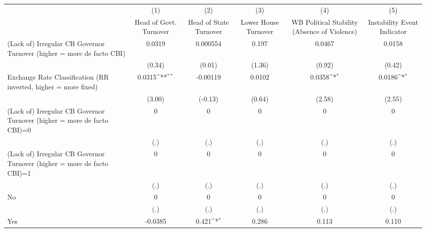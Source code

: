 {
\def\sym#1{\ifmmode^{#1}\else\(^{#1}\)\fi}
\begin{tabular*}{\linewidth}{@{\hskip\tabcolsep\extracolsep\fill}l*{5}{c}}
\toprule
                &\multicolumn{1}{c}{(1)}&\multicolumn{1}{c}{(2)}&\multicolumn{1}{c}{(3)}&\multicolumn{1}{c}{(4)}&\multicolumn{1}{c}{(5)}\\
                &\multicolumn{1}{c}{Head of Govt. Turnover}&\multicolumn{1}{c}{Head of State Turnover}&\multicolumn{1}{c}{Lower House Turnover}&\multicolumn{1}{c}{WB Political Stability (Absence of Violence)}&\multicolumn{1}{c}{Instability Event Indicator}\\
\midrule
(Lack of) Irregular CB Governor Turnover (higher = more de facto CBI)&   0.0319         & 0.000554         &    0.197         &   0.0467         &   0.0158         \\
                &   (0.34)         &   (0.01)         &   (1.36)         &   (0.92)         &   (0.42)         \\
\addlinespace
Exchange Rate Classification (RR inverted, higher = more fixed)&   0.0315\sym{**} & -0.00119         &   0.0102         &   0.0358\sym{*}  &   0.0186\sym{*}  \\
                &   (3.00)         &  (-0.13)         &   (0.64)         &   (2.58)         &   (2.55)         \\
\addlinespace
(Lack of) Irregular CB Governor Turnover (higher = more de facto CBI)=0&        0         &        0         &        0         &        0         &        0         \\
                &      (.)         &      (.)         &      (.)         &      (.)         &      (.)         \\
\addlinespace
(Lack of) Irregular CB Governor Turnover (higher = more de facto CBI)=1&        0         &        0         &        0         &        0         &        0         \\
                &      (.)         &      (.)         &      (.)         &      (.)         &      (.)         \\
\addlinespace
No              &        0         &        0         &        0         &        0         &        0         \\
                &      (.)         &      (.)         &      (.)         &      (.)         &      (.)         \\
\addlinespace
Yes             &  -0.0385         &    0.421\sym{*}  &    0.286         &    0.113         &    0.110         \\

\end{tabular*}}

